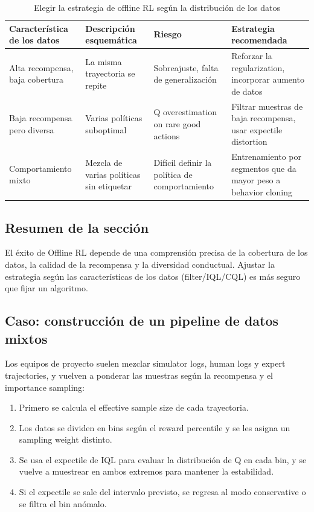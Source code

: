 \documentclass[a4paper]{article}
\begin{document}
\begin{table}[H]
\centering
\begin{tabular}{p{} p{} p{} p{}}
\toprule
Característica de los datos & Descripción esquemática & Riesgo & Estrategia recomendada \\
\midrule
Alta recompensa, baja cobertura & La misma trayectoria se repite & Sobreajuste, falta de generalización & Reforzar la regularization, incorporar aumento de datos \\
Baja recompensa pero diversa & Varias políticas suboptimal & Q overestimation on rare good actions & Filtrar muestras de baja recompensa, usar expectile distortion \\
Comportamiento mixto & Mezcla de varias políticas sin etiquetar & Difícil definir la política de comportamiento & Entrenamiento por segmentos que da mayor peso a behavior cloning \\
\bottomrule
\end{tabular}
\caption{Elegir la estrategia de offline RL según la distribución de los datos}
\end{table}

\subsection{Resumen de la sección}

El éxito de Offline RL depende de una comprensión precisa de la cobertura de los datos, la calidad de la recompensa y la diversidad conductual. Ajustar la estrategia según las características de los datos (filter/IQL/CQL) es más seguro que fijar un algoritmo.

\subsection{Caso: construcción de un pipeline de datos mixtos}

Los equipos de proyecto suelen mezclar simulator logs, human logs y expert trajectories, y vuelven a ponderar las muestras según la recompensa y el importance sampling:

\begin{enumerate}
    \item Primero se calcula el effective sample size de cada trayectoria.
    \item Los datos se dividen en bins según el reward percentile y se les asigna un sampling weight distinto.
    \item Se usa el expectile de IQL para evaluar la distribución de Q en cada bin, y se vuelve a muestrear en ambos extremos para mantener la estabilidad.
    \item Si el expectile se sale del intervalo previsto, se regresa al modo conservative o se filtra el bin anómalo.
\end{enumerate}
\end{document}
